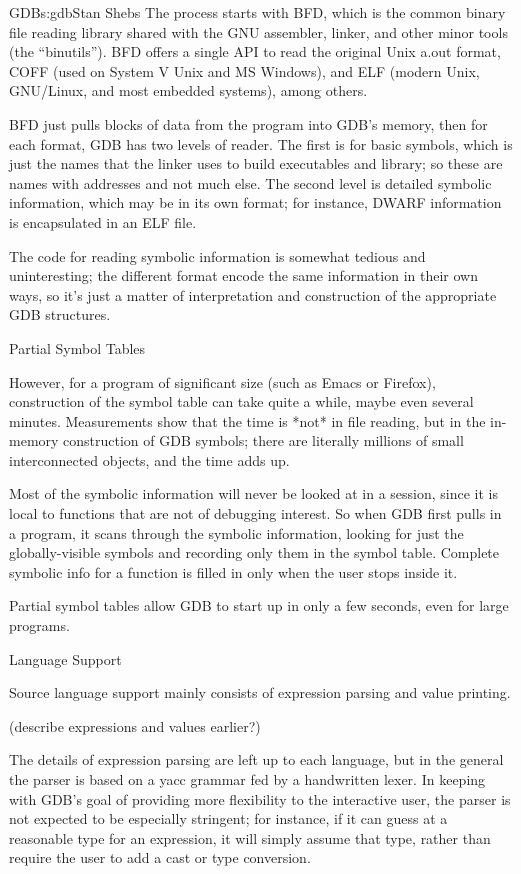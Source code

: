 \begin{aosachapter}{GDB}{s:gdb}{Stan Shebs}
The process starts with BFD, which is the common binary file reading
library shared with the GNU assembler, linker, and other minor tools
(the ``binutils'').  BFD offers a single API to read the original Unix
a.out format, COFF (used on System V Unix and MS Windows), and ELF
(modern Unix, GNU/Linux, and most embedded systems), among others.

BFD just pulls blocks of data from the program into GDB's memory, then
for each format, GDB has two levels of reader.  The first is for basic
symbols, which is just the names that the linker uses to build
executables and library; so these are names with addresses and not
much else.  The second level is detailed symbolic information, which
may be in its own format; for instance, DWARF information is
encapsulated in an ELF file.

The code for reading symbolic information is somewhat tedious and
uninteresting; the different format encode the same information in
their own ways, so it's just a matter of interpretation and construction
of the appropriate GDB structures.

Partial Symbol Tables

However, for a program of significant size (such as Emacs or Firefox),
construction of the symbol table can take quite a while, maybe even
several minutes.  Measurements show that the time is *not* in file
reading, but in the in-memory construction of GDB symbols; there are
literally millions of small interconnected objects, and the time adds
up.

Most of the symbolic information will never be looked at in a session,
since it is local to functions that are not of debugging interest.  So
when GDB first pulls in a program, it scans through the symbolic
information, looking for just the globally-visible symbols and
recording only them in the symbol table.  Complete symbolic info for a
function is filled in only when the user stops inside it.

Partial symbol tables allow GDB to start up in only a few seconds, even
for large programs.

Language Support

Source language support mainly consists of expression parsing and value
printing.

(describe expressions and values earlier?)

The details of expression parsing are left up to each language, but in
the general the parser is based on a yacc grammar fed by a handwritten
lexer.  In keeping with GDB's goal of providing more flexibility to the
interactive user, the parser is not expected to be especially stringent;
for instance, if it can guess at a reasonable type for an expression,
it will simply assume that type, rather than require the user to add
a cast or type conversion.


\end{aosachapter}
